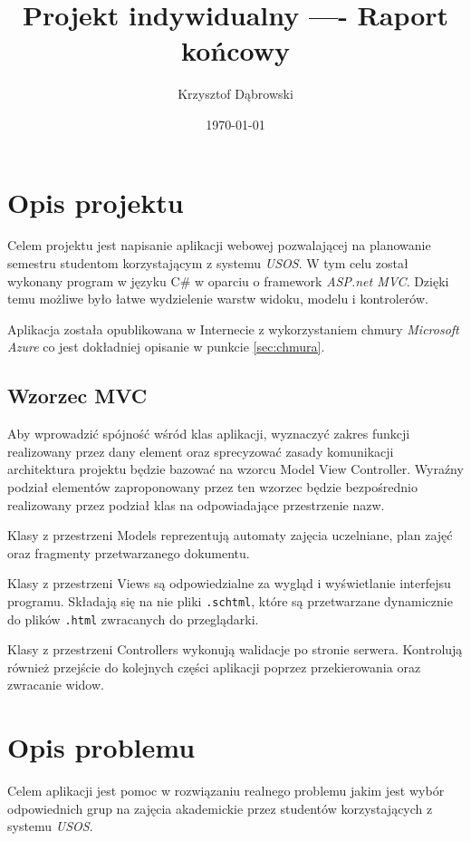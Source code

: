 \documentclass{mwart}
\title{Projekt indywidualny ----  Raport końcowy}
\author{Krzysztof Dąbrowski}
\date{\today}
\begin{document}
\maketitle{}

\tableofcontents{}


\section{Opis projektu}
Celem projektu jest napisanie aplikacji webowej pozwalającej na planowanie semestru studentom korzystającym z systemu \textit{USOS}.
W tym celu został wykonany program w języku C\# w oparciu o framework \textit{ASP.net MVC}. Dzięki temu możliwe było łatwe wydzielenie warstw widoku, modelu i kontrolerów.

Aplikacja została opublikowana w Internecie z wykorzystaniem chmury \textit{Microsoft Azure} co jest dokładniej opisanie w punkcie \ref{sec:chmura}.

\subsection{Wzorzec MVC}
Aby wprowadzić spójność wśród klas aplikacji, wyznaczyć zakres funkcji realizowany przez dany element oraz sprecyzować zasady komunikacji architektura
projektu będzie bazować na wzorcu Model View Controller.
Wyraźny podział elementów zaproponowany przez ten wzorzec będzie bezpośrednio realizowany przez podział klas na odpowiadające przestrzenie nazw.

Klasy z przestrzeni Models reprezentują automaty zajęcia uczelniane, plan zajęć oraz fragmenty przetwarzanego dokumentu.

Klasy z przestrzeni Views są odpowiedzialne za wygląd i wyświetlanie interfejsu programu. Składają się na nie pliki \texttt{.schtml}, które są przetwarzane dynamicznie do plików \texttt{.html} zwracanych do przeglądarki.

Klasy z przestrzeni Controllers wykonują walidacje po stronie serwera. Kontrolują również przejście do kolejnych części aplikacji poprzez przekierowania oraz zwracanie widow.

\section{Opis problemu}
Celem aplikacji jest pomoc w rozwiązaniu realnego problemu jakim jest wybór odpowiednich grup na zajęcia akademickie przez studentów korzystających z systemu \textit{USOS}.
\end{document}
